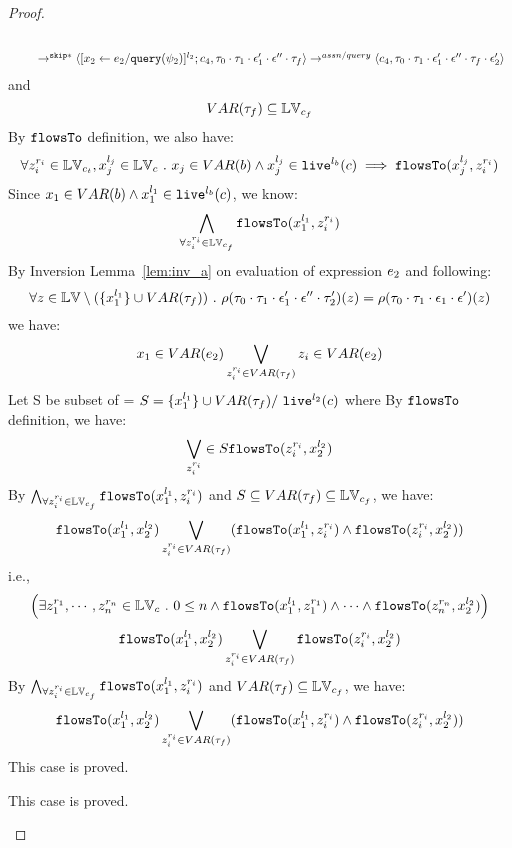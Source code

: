 {\begin{proof}
\begin{subproof}
\begin{enumerate}
\begin{enumerate}
\[\begin{array}{l}
  \\
  \qquad \rightarrow^{\mathtt{skip}*} 
  \langle [\mathrel{ {x}_2 \leftarrow e_2 / {\tt query}(\psi_2) }]^{l_2};{c}_4, 
  \mathtt{\tau}_0 \cdot \mathtt{\tau}_1 \cdot \mathtt{\epsilon}_1' \cdot \mathtt{\epsilon}'' \cdot \mathtt{\tau}_f \rangle
  \rightarrow^{assn/query} 
  \langle {c}_4,  \mathtt{\tau}_0 \cdot \mathtt{\tau}_1 \cdot \mathtt{\epsilon}_1' \cdot \mathtt{\epsilon}'' \cdot \mathtt{\tau}_f \cdot \mathtt{\epsilon}_2' \rangle 
\end{array}
\]
and 
\[
  VAR{(\mathtt{\tau}_f)} \subseteq \mathbb{LV}_{c_f}
\]
%
By $\mathtt{flowsTo}$ definition, we also have:
\[
  \forall z_i^{r_i} \in \mathbb{LV}_{c_t},  x_j^{l_j} \in \mathbb{LV}_c ~.~ 
  x_j \in VAR(b) \land x_j^{l_j} \in \mathtt{live}^{l_b}(c) \implies
  \mathtt{flowsTo}(x_j^{l_j}, z_i^{r_i})
\]
Since $x_1 \in VAR(b) \land x_1^{l_1} \in \mathtt{live}^{l_b}(c)$, we know: 
\[
  \bigwedge_{\forall z_i^{r_i} \in \mathbb{LV}_{c_f}}
  \mathtt{flowsTo}(x_1^{l_1}, z_i^{r_i})
\]
%
By Inversion Lemma~\ref{lem:inv_a} on evaluation of expression $e_2$ and following: 
\[
  \forall z \in \mathbb{LV} \setminus (\{x_1^{l_1}\} \cup VAR{(\mathtt{\tau}_f)}) ~.~
  \rho(\mathtt{\tau}_0 \cdot \mathtt{\tau}_1 \cdot \mathtt{\epsilon}_1'\cdot \mathtt{\epsilon}'' \cdot \mathtt{\tau}_2')(z) 
  = \rho(\mathtt{\tau}_0 \cdot \mathtt{\tau}_1 \cdot \mathtt{\epsilon}_1\cdot \mathtt{\epsilon}')(z)
\]
%
we have:
\[
  x_1 \in VAR(e_2) \bigvee_{z_i^{r_i} \in VAR{(\mathtt{\tau}_f)}} z_i \in VAR(e_2)
\]
%
Let S be subset of = $S = \{x_1^{l_1}\} \cup VAR{(\mathtt{\tau}_f)} /\ \mathtt{live}^{l_2}(c) $ where
%
By $\mathtt{flowsTo}$ definition, we have:
\[
   \bigvee_{z_i^{r_i}} \in S \mathtt{flowsTo}(z_i^{r_i}, x_2^{l_2})
\]
By $ \bigwedge_{\forall z_i^{r_i} \in \mathbb{LV}_{c_f}} \mathtt{flowsTo}(x_1^{l_1}, z_i^{r_i})$ and $S \subseteq VAR{(\mathtt{\tau}_f)} \subseteq \mathbb{LV}_{c_f}$, we have:
\[
\mathtt{flowsTo}(x_1^{l_1}, x_2^{l_2}) \bigvee_{z_i^{r_i} \in VAR{(\mathtt{\tau}_f)}} 
(\mathtt{flowsTo}(x_1^{l_1}, z_i^{r_i}) \land \mathtt{flowsTo}(z_i^{r_i}, x_2^{l_2}))
\]
%
i.e.,
\[
\Big(\exists z_1^{r_1}, \cdots, z_n^{r_n} \in \mathbb{LV}_{{c}} ~.~ 0 \leq n 
 \land \mathtt{flowsTo}(x_1^{l_1}, z_1^{r_1}) \land \cdots \land \mathtt{flowsTo}(z_n^{r_n}, {x}_2^{l_2}) \Big)
\]
%
\[
   \mathtt{flowsTo}(x_1^{l_1}, x_2^{l_2}) \bigvee_{z_i^{r_i} \in VAR{(\mathtt{\tau}_f)}} \mathtt{flowsTo}(z_i^{r_i}, x_2^{l_2})
\]
%
By $ \bigwedge_{\forall z_i^{r_i} \in \mathbb{LV}_{c_f}} \mathtt{flowsTo}(x_1^{l_1}, z_i^{r_i})$ and $VAR{(\mathtt{\tau}_f)} \subseteq \mathbb{LV}_{c_f}$, we have:
\[
\mathtt{flowsTo}(x_1^{l_1}, x_2^{l_2}) \bigvee_{z_i^{r_i} \in VAR{(\mathtt{\tau}_f)}} 
(\mathtt{flowsTo}(x_1^{l_1}, z_i^{r_i}) \land \mathtt{flowsTo}(z_i^{r_i}, x_2^{l_2}))
\]
%
This case is proved.
\end{enumerate}
%
\end{enumerate}
%
This case is proved.
\end{subproof}

\end{proof}}
